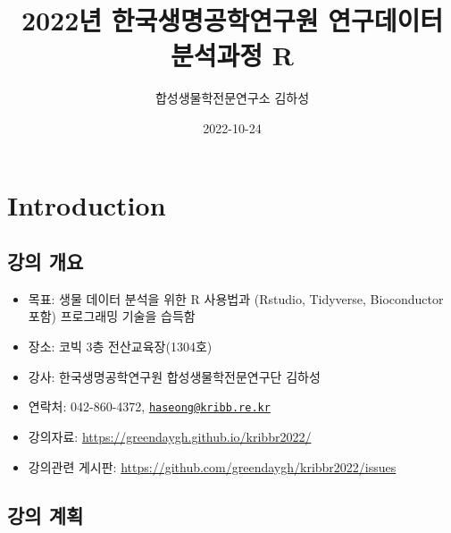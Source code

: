 \documentclass[
]{book}
\title{2022년 한국생명공학연구원 연구데이터 분석과정 R}
\author{합성생물학전문연구소 김하성}
\date{2022-10-24}
\providecommand{\tightlist}{%
  \setlength{\itemsep}{0pt}\setlength{\parskip}{0pt}}
\begin{document}
\maketitle

{
\setcounter{tocdepth}{1}
\tableofcontents
}
\hypertarget{introduction}{%
\chapter{Introduction}\label{introduction}}

\hypertarget{Information}{%
\section{강의 개요}\label{Information}}

\begin{itemize}
\tightlist
\item
  목표: 생물 데이터 분석을 위한 R 사용법과 (Rstudio, Tidyverse, Bioconductor 포함) 프로그래밍 기술을 습득함
\item
  장소: 코빅 3층 전산교육장(1304호)
\item
  강사: 한국생명공학연구원 합성생물학전문연구단 김하성
\item
  연락처: 042-860-4372, \href{mailto:haseong@kribb.re.kr}{\nolinkurl{haseong@kribb.re.kr}}
\item
  강의자료: \url{https://greendaygh.github.io/kribbr2022/}
\item
  강의관련 게시판: \url{https://github.com/greendaygh/kribbr2022/issues}
\end{itemize}

\hypertarget{Schedule}{%
\section{강의 계획}\label{Schedule}}
\end{document}
